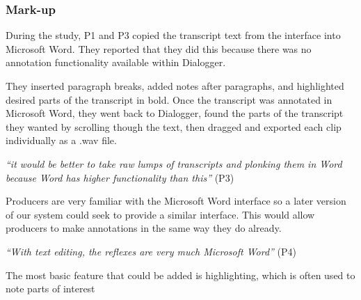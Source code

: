 



\subsubsection{Mark-up}



During the study, P1 and P3 copied the transcript text from the interface into Microsoft Word. They
reported that they did this because there was no annotation functionality
available within Dialogger.

They inserted paragraph breaks, added notes after paragraphs, and
highlighted desired parts of the transcript in bold. Once the transcript was
annotated in Microsoft Word, they went back to Dialogger, found the parts of the
transcript they wanted by scrolling though the text, then dragged and
exported each clip individually as a .wav file.

\textit{``it would be better to take raw lumps of transcripts and plonking them
  in Word because Word has higher functionality than this''} (P3)

Producers are very familiar with the Microsoft Word interface so a later version of our
system could seek to provide a similar interface. This would allow producers to make annotations in the same way they
do already.

\textit{``With text editing, the reflexes are very much Microsoft Word''} (P4)

The most basic feature that could be added is highlighting, which is often used to note parts of interest

